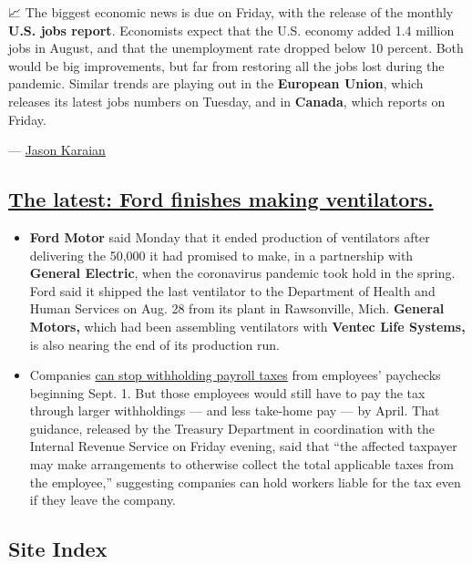 📈 The biggest economic news is due on Friday, with the release of the
monthly \textbf{U.S. jobs report}. Economists expect that the U.S.
economy added 1.4 million jobs in August, and that the unemployment rate
dropped below 10 percent. Both would be big improvements, but far from
restoring all the jobs lost during the pandemic. Similar trends are
playing out in the \textbf{European Union}, which releases its latest
jobs numbers on Tuesday, and in \textbf{Canada}, which reports on
Friday.

--- \href{https://www.nytimes3xbfgragh.onion/by/jason-karaian}{Jason
Karaian}

\hypertarget{the-latest-ford-finishes-making-ventilators}{%
\subsection{\texorpdfstring{\protect\hyperlink{the-latest-ford-finishes-making-ventilators}{The
latest: Ford finishes making
ventilators.}}{The latest: Ford finishes making ventilators.}}\label{the-latest-ford-finishes-making-ventilators}}

\begin{itemize}
\item
  \textbf{Ford Motor} said Monday that it ended production of
  ventilators after delivering the 50,000 it had promised to make, in a
  partnership with \textbf{General Electric}, when the coronavirus
  pandemic took hold in the spring. Ford said it shipped the last
  ventilator to the Department of Health and Human Services on Aug. 28
  from its plant in Rawsonville, Mich. \textbf{General Motors,} which
  had been assembling ventilators with \textbf{Ventec Life Systems,} is
  also nearing the end of its production run.
\item
  Companies
  \href{https://www.nytimes3xbfgragh.onion/2020/08/28/us/politics/trump-tax-holiday-bill-due.html}{can
  stop withholding payroll taxes} from employees' paychecks beginning
  Sept. 1. But those employees would still have to pay the tax through
  larger withholdings --- and less take-home pay --- by April. That
  guidance, released by the Treasury Department in coordination with the
  Internal Revenue Service on Friday evening, said that ``the affected
  taxpayer may make arrangements to otherwise collect the total
  applicable taxes from the employee,'' suggesting companies can hold
  workers liable for the tax even if they leave the company.
\end{itemize}

\hypertarget{site-index}{%
\subsection{Site Index}\label{site-index}}

